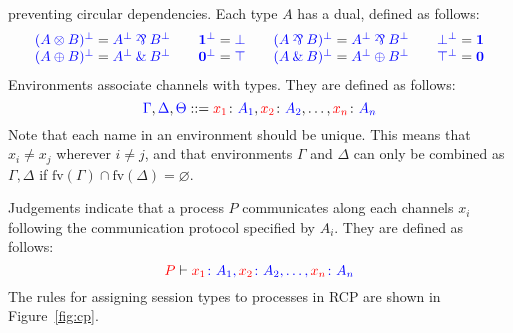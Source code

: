 \documentclass[a4paper,UKenglish]{lipics-v2016}
\begin{document}
preventing circular dependencies. Each type $A$ has a dual, defined as follows:
\[
  \begin{array}{ccccccc}
    \tm{( A \tens B )^\bot} = \tm{A^\bot \parr B^\bot}&&
    \tm{\one^\bot}          = \tm{\bot}&&
    \tm{( A \parr B )^\bot} = \tm{A^\bot \parr B^\bot}&&
    \tm{\bot^\bot}          = \tm{\one}\\
    \tm{( A \plus B )^\bot} = \tm{A^\bot \with B^\bot}&&
    \tm{\nil^\bot}          = \tm{\top}&&
    \tm{( A \with B )^\bot} = \tm{A^\bot \plus B^\bot}&&
    \tm{\top^\bot}          = \tm{\nil}
  \end{array}
\]
Environments associate channels with types. They are defined as follows:
\[
  \blue{\Gamma},\blue{\Delta},\blue{\Theta} ::=
  \tm[x_1]{A_1},\tm[x_2]{A_2},\dots,\tm[x_n]{A_n}
\]
Note that each name in an environment should be unique. This means that $x_i
\neq x_j$ wherever $i \neq j$, and that environments $\Gamma$ and $\Delta$ can
only be combined as $\Gamma, \Delta$ if $\text{fv}(\Gamma) \cap
\text{fv}(\Delta) = \varnothing$.

Judgements indicate that a process $P$ communicates along each channels $x_i$
following the communication protocol specified by $A_i$. They are defined as
follows:
\[
  \seq[{ P }]{ \tm[x_1]{A_1},\tm[x_2]{A_2},\dots,\tm[x_n]{A_n} }
\]
The rules for assigning session types to processes in RCP are shown in
Figure~\ref{fig:cp}.
%

\end{document}
